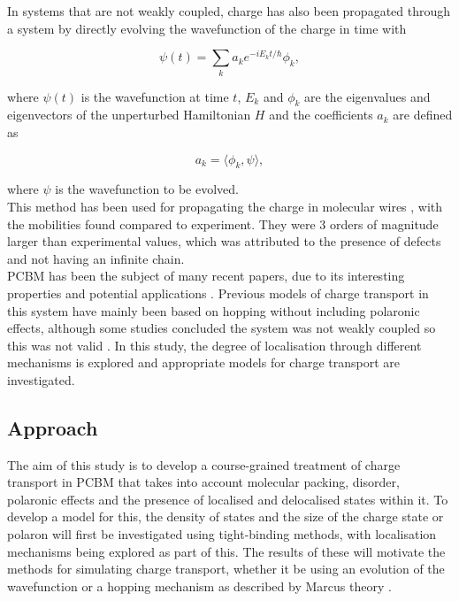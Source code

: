 \documentclass[a4paper,12pt]{article}
\begin{document}
\noindent In systems that are not weakly coupled, charge has also been propagated through a system by directly evolving the wavefunction of the charge in time with

\begin{equation}
\psi(t) = \sum_k a_k e^{-iE_kt/\hbar} \phi_k,
\label{eq:time}
\end{equation}

\noindent where $\psi(t)$ is the wavefunction at time $t$, $E_k$ and $\phi_k$ are the eigenvalues and eigenvectors of the unperturbed Hamiltonian $H$ and the coefficients $a_k$ are defined as

\begin{equation}
a_k=\langle \phi_k , \psi \rangle,
\end{equation}

\noindent where $\psi$ is the wavefunction to be evolved.\\ 

\noindent This method has been used for propagating the charge in molecular wires \cite{Prins2006}, with the mobilities found compared to experiment. They were 3 orders of magnitude larger than experimental values, which was attributed to the presence of defects and not having an infinite chain. \\

\noindent PCBM has been the subject of many recent papers, due to its interesting properties and potential applications \cite{Savoie2014a} \cite{Albrecht2014} \cite{Frost2010}. Previous models of charge transport in this system have mainly been based on hopping without including polaronic effects, although some studies concluded the system was not weakly coupled so this was not valid \cite{Cheung2010} \cite{Oberhofer2012} \cite{Gajdos2013}. In this study, the degree of localisation through different mechanisms is explored and appropriate models for charge transport are investigated.

\subsection{Approach}

The aim of this study is to develop a course-grained treatment of charge transport in PCBM that takes into account molecular packing, disorder, polaronic effects and the presence of localised and delocalised states within it. To develop a model for this, the density of states and the size of the charge state or polaron will first be investigated using tight-binding methods, with localisation mechanisms being explored as part of this. The results of these will motivate the methods for simulating charge transport, whether it be using an evolution of the wavefunction or a hopping mechanism as described by Marcus theory \cite{Marcus1956}.\\
\end{document}
